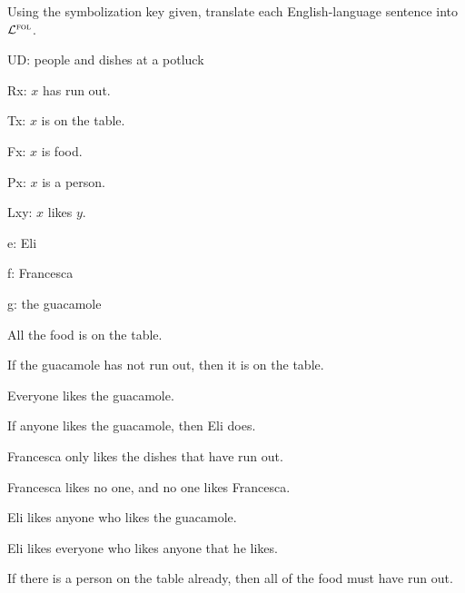 \solutions
\problempart
\label{pr.$\FOL$potluck}
Using the symbolization key given, translate each English-language sentence into $\FOL$.
\begin{ekey}
\item[UD:] people and dishes at a potluck
\item[Rx:] $x$ has run out.
\item[Tx:] $x$ is on the table.
\item[Fx:] $x$ is food.
\item[Px:] $x$ is a person.
\item[Lxy:] $x$ likes $y$.
\item[e:] Eli
\item[f:] Francesca
\item[g:] the guacamole
\end{ekey}
\begin{earg}
\item All the food is on the table.
\item If the guacamole has not run out, then it is on the table.
\item Everyone likes the guacamole.
\item If anyone likes the guacamole, then Eli does.
\item Francesca only likes the dishes that have run out.
\item Francesca likes no one, and no one likes Francesca.
\item Eli likes anyone who likes the guacamole.
\item Eli likes everyone who likes anyone that he likes.
\item If there is a person on the table already, then all of the food must have run out.
\end{earg}


